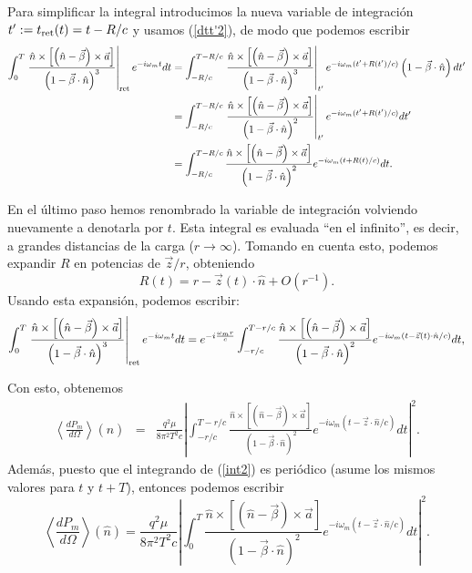 Para simplificar la integral introducimos la nueva variable de integración
$t':=t_{\rm ret}(t)=t-{R}/{c}$ y usamos (\ref{dtt'2}), de modo que podemos escribir
\begin{align}
\int_0^{T}\left.\frac{\hat{n}\times\left[\left(\hat{n}-\vec{\beta}\right)\times\vec{a}\right] }{\left(1-\vec{\beta}\cdot\hat{n}\right)^3}\right|_{\rm ret} e^{-i\omega_{m}t}dt &= \int_{-R/c}^{T-R/c}\left.\frac{\hat{n}\times\left[ \left( \hat{n}-\vec{\beta}\right)\times{\vec{a}}\right] }{\left( 1-\vec{\beta}\cdot\hat{n}\right)^3}\right|_{t'}e^{-i\omega_m (t'+R(t')/c)}\left(1-\vec{\beta}\cdot\hat{n}\right) dt' \\
&= \int_{-R/c}^{T-R/c}\left.\frac{\hat{n}\times\left[ \left( \hat{n}-\vec{\beta}\right)
\times{\vec{a}}\right] }{\left(1-\vec{\beta}\cdot\hat{n}\right)^2}
\right|_{t'}e^{-i\omega_m (t'+R(t')/c)} dt' \\
&= \int_{-R/c}^{T-R/c}\frac{\hat{n}\times\left[ \left( \hat{n}-\vec{\beta}\right)
\times{\vec{a}}\right] }{\left( 1-\vec{\beta}\cdot\hat{n}\right)^2}
e^{-i\omega_m(t+R(t)/c)} dt.
\end{align}

En el último paso hemos renombrado la variable de integración volviendo
nuevamente a denotarla por $t$. Esta integral es evaluada ``en el infinito'', es decir, a grandes distancias de la carga ($r\rightarrow\infty$). Tomando en cuenta esto, podemos expandir $R$ en potencias de ${\vec{z}}/{r}$, obteniendo
\begin{equation}
R(t)  =r-\vec{z}(t) \cdot\hat{n}+O\left(r^{-1}\right). \label{expR} %
\end{equation}
Usando esta expansión, podemos escribir:
\begin{equation}
\int_0^{T}\left.\frac{\hat{n}\times\left[\left(\hat{n}-\vec{\beta}\right)\times\vec{a}\right] }{\left(1-\vec{\beta}\cdot\hat{n}\right)^3}\right|_{\rm ret} e^{-i\omega_{m}t}dt =e^{-i\frac{\omega_m r}{c}}\int_{-r/c}^{T-r/c}\frac{\hat{n}\times\left[ \left( \hat{n}-\vec{\beta}\right)\times{\vec{a}}\right] }{\left( 1-\vec{\beta}\cdot\hat{n}\right)^2}
e^{-i\omega_m(t-\vec{z}(t)\cdot\hat{n}/c)} dt,
\end{equation}

Con esto, obtenemos
\begin{eqnarray}
\left\langle \frac{dP_{m}}{d\Omega}\right\rangle (\hat{n})
  &=&\frac{q^2\mu}{8\pi^2T^2c}\left|
\int_{-{r}/{c}}^{T-{r}/{c}}\frac{\hat{n}\times\left[\left(\hat{n}-\vec{
\beta}\right)\times\vec{a}\right]}{\left(1-\vec{\beta}\cdot\hat{n}\right)^2} e^{-i\omega_{m}\left(t-\vec{z}\cdot\hat{n}/c\right)}dt \right|^2. \label{int2}
\end{eqnarray}
Además, puesto que el integrando de (\ref{int2}) es periódico (asume los
mismos valores para $t$ y $t+T$), entonces podemos escribir
\begin{equation}
\boxed{\left\langle \frac{dP_{m}}{d\Omega}\right\rangle (\hat{n})
=\frac{q^2\mu}{8\pi^2T^2c}\left|
\int_0^{T}\frac{\hat{n}\times\left[\left(\hat{n}-\vec{\beta}\right)
\times\vec{a}\right]}{\left(1-\vec{\beta}\cdot\hat{n}\right)^2} e^{-i\omega_{m}\left(t-\vec{z}\cdot\hat{n}/c\right)}dt \right|^2.}\label{int3}
\end{equation}

